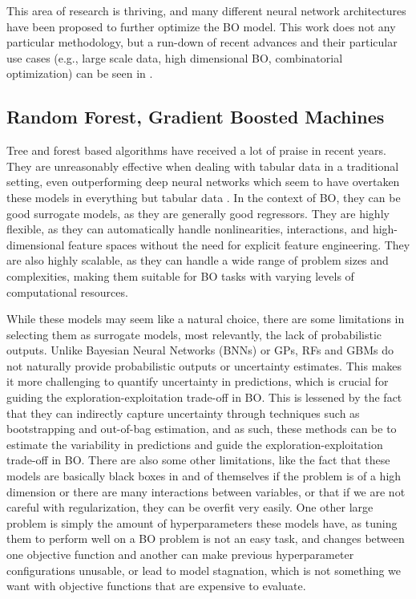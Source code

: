 This area of research is thriving, and many different neural network architectures have been proposed to further optimize the BO model. This work does not  any particular methodology, but a run-down of recent advances and their particular use cases (e.g., large scale data, high dimensional BO, combinatorial optimization) can be seen in \cite{wang2023recent}.

\subsection{Random Forest, Gradient Boosted Machines}

Tree and forest based algorithms have received a lot of praise in recent years. They are unreasonably effective when dealing with tabular data in a traditional setting, even outperforming deep neural networks which seem to have overtaken these models in everything but tabular data \cite{grinsztajn2022tree}. In the context of BO, they can be good surrogate models, as they are generally good regressors. They are highly flexible, as they can automatically handle nonlinearities, interactions, and high-dimensional feature spaces without the need for explicit feature engineering. They are also highly scalable, as they can handle a wide range of problem sizes and complexities, making them suitable for BO tasks with varying levels of computational resources.

While these models may seem like a natural choice, there are some limitations in selecting them as surrogate models, most relevantly, the lack of probabilistic outputs. Unlike Bayesian Neural Networks (BNNs) or GPs, RFs and GBMs do not naturally provide probabilistic outputs or uncertainty estimates. This makes it more challenging to quantify uncertainty in predictions, which is crucial for guiding the exploration-exploitation trade-off in BO. This is lessened by the fact that they can indirectly capture uncertainty through techniques such as bootstrapping and out-of-bag estimation, and as such, these methods can be  to estimate the variability in predictions and guide the exploration-exploitation trade-off in BO. There are also some other limitations, like the fact that these models are basically black boxes in and of themselves if the problem is of a high dimension or there are many interactions between variables, or that if we are not careful with regularization, they can be overfit very easily. One other large problem is simply the amount of hyperparameters these models have, as tuning them to perform well on a BO problem is not an easy task, and changes between one objective function and another can make previous hyperparameter configurations unusable, or lead to model stagnation, which is not something we want with objective functions that are expensive to evaluate. 

